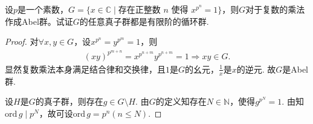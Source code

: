 \documentclass[../../main.tex]{subfiles}%
\begin{document}
\begin{example}
设$p$是一个素数，$G=\{x\in\mathbb{C}\mid \text{存在正整数 }n\text{ 使得 }x^{p^n}=1\}$，则$G$对于复数的乘法作成Abel群。试证$G$的任意真子群都是有限阶的循环群.
\end{example}
\begin{proof}
对$\forall x,y\in G$，设$x^{p^n}=y^{p^m}=1$，则
\begin{align*}
(xy)^{p^{m+n}}=x^{p^{n+m}}y^{p^{n+m}}=1\Longrightarrow xy\in G.
\end{align*}
显然复数乘法本身满足结合律和交换律，且$1$是$G$的幺元，$\frac{1}{x}$是$x$的逆元. 故$G$是Abel群.

设$H$是$G$的真子群，则存在$g\in G\setminus H$. 由$G$的定义知存在$N\in\mathbb{N}$，使得$g^{p^N}=1$. 由知$\mathrm{ord}\,g\mid p^N$，故可设$\mathrm{ord}\,g=p^n(n\leqslant N)$.


\end{proof}
\end{document}
